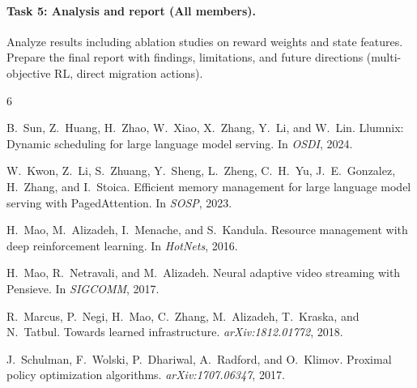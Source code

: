 \documentclass{article}
\begin{document}
\paragraph{Task 5: Analysis and report \textnormal{(All members).}}
Analyze results including ablation studies on reward weights and state features. Prepare the final report with findings, limitations, and future directions (multi-objective RL, direct migration actions).

\begin{thebibliography}{6}
\small

B.~Sun, Z.~Huang, H.~Zhao, W.~Xiao, X.~Zhang, Y.~Li, and W.~Lin.
Llumnix: Dynamic scheduling for large language model serving.
In \emph{OSDI}, 2024.

W.~Kwon, Z.~Li, S.~Zhuang, Y.~Sheng, L.~Zheng, C.~H.~Yu, J.~E.~Gonzalez, H.~Zhang, and I.~Stoica.
Efficient memory management for large language model serving with {PagedAttention}.
In \emph{SOSP}, 2023.

H.~Mao, M.~Alizadeh, I.~Menache, and S.~Kandula.
Resource management with deep reinforcement learning.
In \emph{HotNets}, 2016.

H.~Mao, R.~Netravali, and M.~Alizadeh.
Neural adaptive video streaming with {Pensieve}.
In \emph{SIGCOMM}, 2017.

R.~Marcus, P.~Negi, H.~Mao, C.~Zhang, M.~Alizadeh, T.~Kraska, and N.~Tatbul.
Towards learned infrastructure.
\emph{arXiv:1812.01772}, 2018.

J.~Schulman, F.~Wolski, P.~Dhariwal, A.~Radford, and O.~Klimov.
Proximal policy optimization algorithms.
\emph{arXiv:1707.06347}, 2017.

\end{thebibliography}
\end{document}

